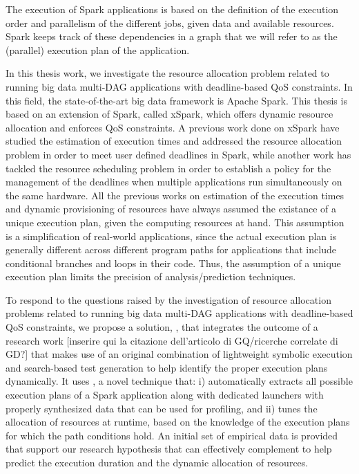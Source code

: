 The execution of Spark applications is based on the definition of the execution order and parallelism of the different jobs, given data and available resources. Spark keeps track of these dependencies in a graph that we will refer to as the (parallel) execution plan of the application.


 In this thesis work, we investigate the resource allocation problem related to running big data multi-DAG applications with deadline-based QoS constraints. In this field, the state-of-the-art big data framework is Apache Spark. This thesis is based on an extension of Spark, called xSpark, which offers dynamic resource allocation and enforces QoS constraints.
 A previous work done on xSpark have studied the estimation of execution times and addressed the resource allocation problem in order to meet user defined deadlines in Spark, while another work has tackled the resource scheduling problem in order to establish a policy for the management of the deadlines when multiple applications run simultaneously on the same hardware. 
 All the previous works on estimation of the execution times and dynamic provisioning of resources have always assumed the existance of a unique execution plan, given the computing resources at hand. This assumption is a simplification of real-world applications, since the actual execution plan is generally different across different program paths for applications that include conditional branches and loops in their code. Thus, the assumption of a unique execution plan limits the precision of analysis/prediction techniques.

 To respond to the questions raised by the investigation of resource allocation problems related to running big data multi-DAG applications with deadline-based QoS constraints, we propose a solution, \tool, that integrates the outcome of a research work [inserire qui la citazione dell'articolo di GQ/ricerche correlate di GD?] that makes use of an original combination of lightweight symbolic execution and search-based test generation to help identify the proper execution plans dynamically. It uses \dSymb, a novel technique that: i) automatically extracts all possible execution plans of a Spark application along with dedicated launchers with properly synthesized data that can be used for profiling, and ii) tunes the allocation of resources at runtime, based on the knowledge of the execution plans for which the path conditions hold. An initial set of empirical data is provided that support our research hypothesis that \dSymb can effectively complement \cSpark to help predict the execution duration and the dynamic allocation of resources.

